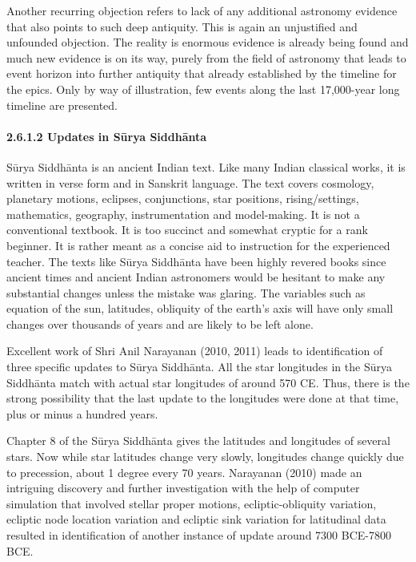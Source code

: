 Another recurring objection refers to lack of any additional astronomy evidence that also points to such deep antiquity. This is again an unjustified and unfounded objection. The reality is enormous evidence is already being found and much new evidence is on its way, purely from the field of astronomy that leads to event horizon into further antiquity that already established by the timeline for the epics. Only by way of illustration, few events along the last 17,000-year long timeline are presented.


\paragraph*{2.6.1.2 Updates in Sūrya Siddhānta}

Sūrya Siddhānta is an ancient Indian text. Like many Indian classical works, it is written in verse form and in Sanskrit language. The text covers cosmology, planetary motions, eclipses, conjunctions, star positions, rising/settings, mathematics, geography, instrumentation and model-making. It is not a conventional textbook. It is too succinct and somewhat cryptic for a rank beginner. It is rather meant as a concise aid to instruction for the experienced teacher. The texts like Sūrya Siddhānta have been highly revered books since ancient times and ancient Indian astronomers would be hesitant to make any substantial changes unless the mistake was glaring. The variables such as equation of the sun, latitudes, obliquity of the earth's axis will have only small changes over thousands of years and are likely to be left alone.

\vskip 3pt

Excellent work of Shri Anil Narayanan (2010, 2011) leads to identification of three specific updates to Sūrya Siddhānta. All the star longitudes in the Sūrya Siddhānta match with actual star longitudes of around 570 CE. Thus, there is the strong possibility that the last update to the longitudes were done at that time, plus or minus a hundred years.

\vskip 3pt

Chapter 8 of the Sūrya Siddhānta gives the latitudes and longitudes of several stars. Now while star latitudes change very slowly, longitudes change quickly due to precession, about 1 degree every 70 years. Narayanan (2010) made an intriguing discovery and further investigation with the help of computer simulation that involved stellar proper motions, ecliptic-obliquity variation, ecliptic node location variation and ecliptic sink variation for latitudinal data resulted in identification of another instance of update around 7300 BCE-7800 BCE.

